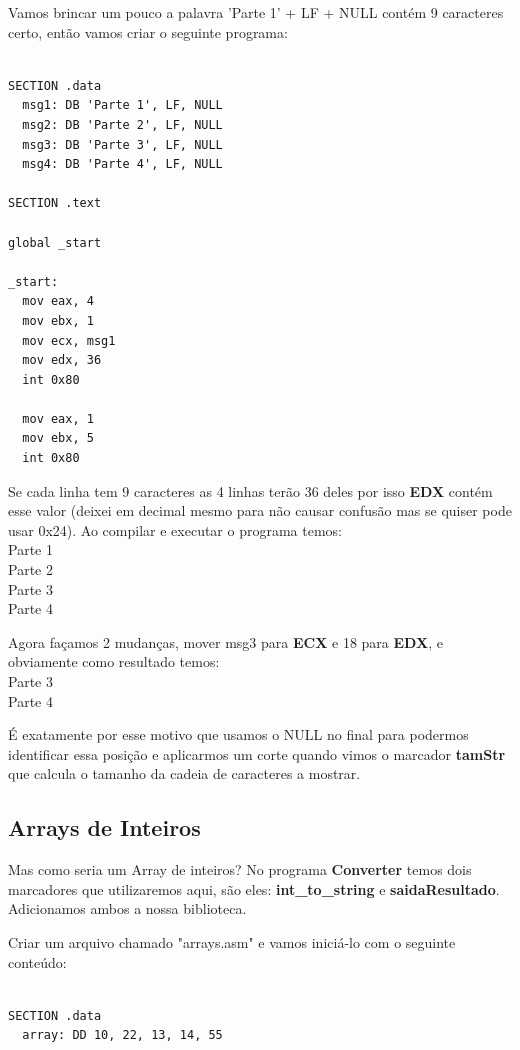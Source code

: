 Vamos brincar um pouco a palavra 'Parte 1' + LF + NULL contém 9 caracteres certo, então vamos criar o seguinte programa:
\begin{lstlisting}[]
%include 'bibliotecaE.inc'

SECTION .data
  msg1: DB 'Parte 1', LF, NULL
  msg2: DB 'Parte 2', LF, NULL
  msg3: DB 'Parte 3', LF, NULL
  msg4: DB 'Parte 4', LF, NULL

SECTION .text

global _start

_start:
  mov eax, 4
  mov ebx, 1
  mov ecx, msg1
  mov edx, 36
  int 0x80

  mov eax, 1
  mov ebx, 5
  int 0x80  
\end{lstlisting}

Se cada linha tem 9 caracteres as 4 linhas terão 36 deles por isso \textbf{EDX} contém esse valor (deixei em decimal mesmo para não causar confusão mas se quiser pode usar 0x24). Ao compilar e executar o programa temos: \\
{\ttfamily Parte 1} \\
{\ttfamily Parte 2} \\
{\ttfamily Parte 3} \\
{\ttfamily Parte 4}

Agora façamos 2 mudanças, mover msg3 para \textbf{ECX} e 18 para \textbf{EDX}, e obviamente como resultado temos: \\
{\ttfamily Parte 3} \\
{\ttfamily Parte 4}

É exatamente por esse motivo que usamos o NULL no final para podermos identificar essa posição e aplicarmos um corte quando vimos o marcador \textbf{tamStr} que calcula o tamanho da cadeia de caracteres a mostrar. 

\subsection{Arrays de Inteiros}
Mas como seria um Array de inteiros? No programa \textbf{Converter} temos dois marcadores que utilizaremos aqui, são eles: \textbf{int\_to\_string} e \textbf{saidaResultado}. Adicionamos ambos a nossa biblioteca.

Criar um arquivo chamado "arrays.asm" e vamos iniciá-lo com o seguinte conteúdo:
\begin{lstlisting}[]
%include 'bibliotecaE.inc'

SECTION .data
  array: DD 10, 22, 13, 14, 55
\end{lstlisting}

